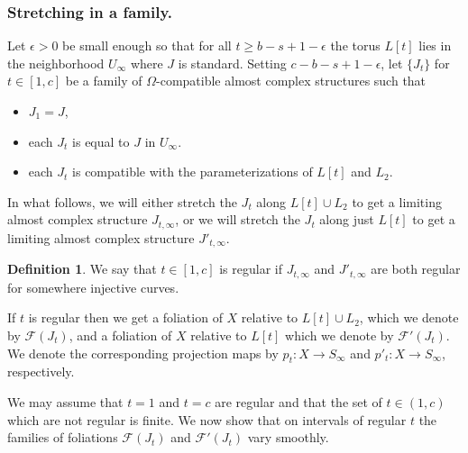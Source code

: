 \documentclass[12pt]{amsart}
\theoremstyle{definition}
\newtheorem{definition}[theorem]{Definition}
\begin{document}
\bigskip

\subsubsection{Stretching in a family.}
Let $\epsilon>0$ be small enough so that for all $t \ge b-s+1 -\epsilon$ the torus $L[t]$ lies in the neighborhood  $U_\infty$ where $J$ is standard. Setting $c-b-s+1-\epsilon$, let $\{J_t\}$ for $t \in [1,c]$ be a family of $\Omega$-compatible almost complex structures such that 
\begin{itemize}
    \item $J_1=J$,\\
    \item each $J_t$ is equal to $J$ in $U_\infty.$\\
    \item each $J_t$ is compatible with the parameterizations of $L[t]$ and $L_2$.
\end{itemize}

\medskip
In what follows, we will either stretch the $J_t$ along $L[t] \cup L_2$ to get a limiting almost complex structure $J_{t, \infty}$, or we will stretch the $J_t$ along just $L[t]$ to get a limiting almost complex structure $J'_{t, \infty}$. 

\begin{definition}\label{regulart}
 We say that $t \in [1,c]$ is regular if $J_{t, \infty}$ and $J'_{t, \infty}$  are both regular for somewhere injective curves.
\end{definition}



If $t$ is regular then we get a foliation of $X$ relative to $L[t] \cup L_2$, which we denote by $\mathcal{F}(J_t)$, and 
a foliation of $X$ relative to $L[t]$ which we denote by $\mathcal{F}'(J_t)$. We denote the corresponding projection maps by $p_t \colon X \to S_\infty$ and $p'_t \colon X \to S_\infty$, respectively.

\medskip


We may assume that $t=1$ and $t=c$ are regular and that the set of  $t \in (1,c)$ which are not regular is finite.
We now show that on intervals of regular $t$ the families of foliations $\mathcal{F}(J_t)$ and $\mathcal{F}'(J_t)$ vary smoothly.





\end{document}
